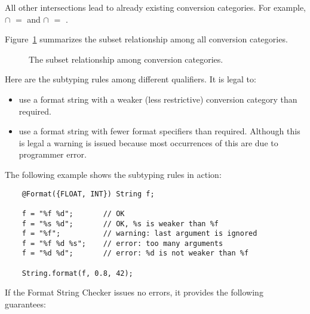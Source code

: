 \noindent All other intersections lead to already existing conversion categories.
For example,  $\cap$  $=$  and
 $\cap$  $=$ .

Figure~\ref{fig-formatter-cat} summarizes the subset
relationship among all conversion categories.

\begin{figure}[thbp]
    \caption{The subset relationship
        among conversion categories.}
    \label{fig-formatter-cat}
\end{figure}



Here are the subtyping rules among different
qualifiers.
It is legal to:

\begin{itemize}
\item use a format string with a weaker (less restrictive) conversion category than required.
\item use a format string with fewer format specifiers than required.
  Although this is legal a warning is issued because most occurrences of
  this are due to programmer error.
\end{itemize}

The following example shows the subtyping rules in action:

\begin{Verbatim}
    @Format({FLOAT, INT}) String f;

    f = "%f %d";       // OK
    f = "%s %d";       // OK, %s is weaker than %f
    f = "%f";          // warning: last argument is ignored
    f = "%f %d %s";    // error: too many arguments
    f = "%d %d";       // error: %d is not weaker than %f

    String.format(f, 0.8, 42);
\end{Verbatim}


If the Format String Checker issues no errors, it provides the following guarantees:

